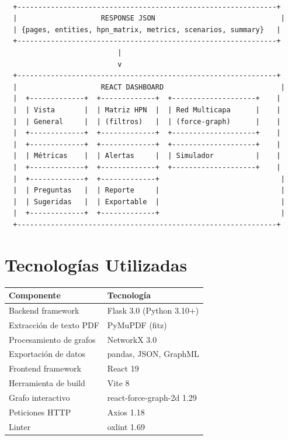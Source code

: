 \documentclass[12pt, letterpaper]{article}
\begin{document}
\begin{verbatim}
                                                               
  +--------------------------------------------------------------+
  |                    RESPONSE JSON                              |
  | {pages, entities, hpn_matrix, metrics, scenarios, summary}   |
  +--------------------------------------------------------------+
                           |
                           v
  +--------------------------------------------------------------+
  |                    REACT DASHBOARD                            |
  |  +-------------+  +-------------+  +--------------------+    |
  |  | Vista       |  | Matriz HPN  |  | Red Multicapa      |    |
  |  | General     |  | (filtros)   |  | (force-graph)      |    |
  |  +-------------+  +-------------+  +--------------------+    |
  |  +-------------+  +-------------+  +--------------------+    |
  |  | Métricas    |  | Alertas     |  | Simulador          |    |
  |  +-------------+  +-------------+  +--------------------+    |
  |  +-------------+  +-------------+                             |
  |  | Preguntas   |  | Reporte     |                             |
  |  | Sugeridas   |  | Exportable  |                             |
  |  +-------------+  +-------------+                             |
  +--------------------------------------------------------------+
\end{verbatim}

\section{Tecnologías Utilizadas}

\begin{center}
\begin{tabularx}{\textwidth}{lX}
\toprule
\textbf{Componente} & \textbf{Tecnología} \\
\midrule
Backend framework & Flask 3.0 (Python 3.10+) \\
Extracción de texto PDF & PyMuPDF (fitz) \\
Procesamiento de grafos & NetworkX 3.0 \\
Exportación de datos & pandas, JSON, GraphML \\
Frontend framework & React 19 \\
Herramienta de build & Vite 8 \\
Grafo interactivo & react-force-graph-2d 1.29 \\
Peticiones HTTP & Axios 1.18 \\
Linter & oxlint 1.69 \\
\bottomrule
\end{tabularx}
\end{center}
\end{document}
